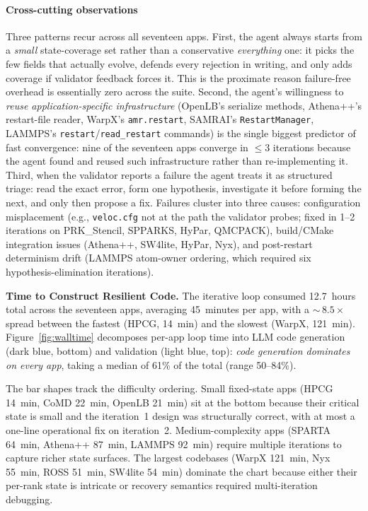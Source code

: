 \documentclass[conference]{IEEEtran}
\begin{document}
\paragraph{Cross-cutting observations}
Three patterns recur across all seventeen apps. First, the agent always starts from a \emph{small} state-coverage set rather than a conservative \emph{everything} one: it picks the few fields that actually evolve, defends every rejection in writing, and only adds coverage if validator feedback forces it. This is the proximate reason failure-free overhead is essentially zero across the suite. Second, the agent's willingness to \emph{reuse application-specific infrastructure} (OpenLB's serialize methods, Athena++'s restart-file reader, WarpX's \texttt{amr.restart}, SAMRAI's \texttt{RestartManager}, LAMMPS's \texttt{restart}/\texttt{read\_restart} commands) is the single biggest predictor of fast convergence: nine of the seventeen apps converge in $\le 3$ iterations because the agent found and reused such infrastructure rather than re-implementing it. Third, when the validator reports a failure the agent treats it as structured triage: read the exact error, form one hypothesis, investigate it before forming the next, and only then propose a fix. Failures cluster into three causes: configuration misplacement (e.g., \texttt{veloc.cfg} not at the path the validator probes; fixed in 1--2 iterations on PRK\_Stencil, SPPARKS, HyPar, QMCPACK), build/CMake integration issues (Athena++, SW4lite, HyPar, Nyx), and post-restart determinism drift (LAMMPS atom-owner ordering, which required six hypothesis-elimination iterations).

\medskip
\noindent\textbf{Time to Construct Resilient Code.}
The iterative loop consumed 12.7~hours total across the seventeen apps, averaging 45~minutes per app, with a $\sim$\,$8.5\times$ spread between the fastest (HPCG, 14~min) and the slowest (WarpX, 121~min). Figure~\ref{fig:walltime} decomposes per-app loop time into LLM code generation (dark blue, bottom) and validation (light blue, top): \emph{code generation dominates on every app}, taking a median of 61\% of the total (range 50--84\%).

The bar shapes track the difficulty ordering. Small fixed-state apps (HPCG 14~min, CoMD 22~min, OpenLB 21~min) sit at the bottom because their critical state is small and the iteration~1 design was structurally correct, with at most a one-line operational fix on iteration~2. Medium-complexity apps (SPARTA 64~min, Athena++ 87~min, LAMMPS 92~min) require multiple iterations to capture richer state surfaces. The largest codebases (WarpX 121~min, Nyx 55~min, ROSS 51~min, SW4lite 54~min) dominate the chart because either their per-rank state is intricate or recovery semantics required multi-iteration debugging.
\end{document}
